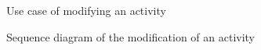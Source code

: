 \documentclass[12pt,titlepage]{article}
\begin{document}
\begin{figure}
\centering
{}
\caption{Use case of modifying an activity}
\clearpage
\newpage
\end{figure}
\begin{figure}
\centering
{} 
\caption{Sequence diagram of the modification of an activity}
\end{figure}
\clearpage
\newpage
\end{document}
